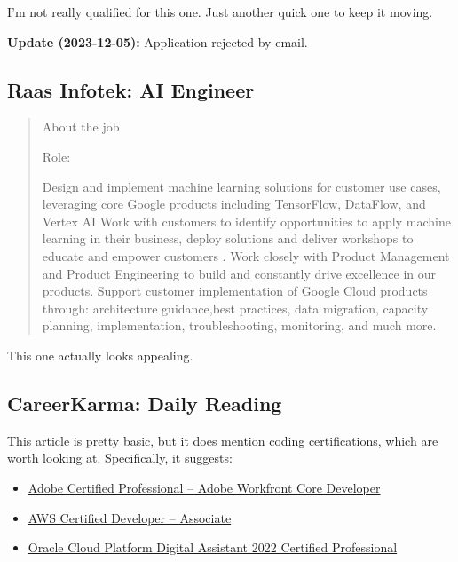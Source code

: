\documentclass[
	letterpaper, %
	12pt, %
]{CSSullivanBusinessReport}
\begin{document}
I'm not really qualified for this one. Just another quick one to keep it moving. 

\textbf{Update (2023-12-05):} Application rejected by email.

\subsection[Raas Infotek]{Raas Infotek: AI Engineer}

\begin{quote}
	About the job
	
	Role:
	
	Design and implement machine learning solutions for customer use cases, leveraging core Google products including TensorFlow, DataFlow, and Vertex AI
	Work with customers to identify opportunities to apply machine learning in their business, deploy solutions and deliver workshops to educate and empower customers .
	Work closely with Product Management and Product Engineering to build and constantly drive excellence in our products.
	Support customer implementation of Google Cloud products through: architecture guidance,best practices, data migration, capacity planning, implementation, troubleshooting, monitoring, and much more. 
\end{quote}

This one actually looks appealing. 

\subsection[CareerKarma]{CareerKarma: Daily Reading \autocite{careerkarmaCodingSteps}}

\href{https://careerkarma.com/blog/how-to-get-a-job-in-coding}{This article} is pretty basic, but it does mention coding certifications, which are worth looking at. Specifically, it suggests: 

\begin{itemize}
	\item \href{https://spark.adobe.com/page/07VQBSuNDWMR4/}{Adobe Certified Professional – Adobe Workfront Core Developer}
	\item \href{https://aws.amazon.com/certification/certified-developer-associate/}{AWS Certified Developer – Associate}
	\item \href{https://education.oracle.com/oracle-cloud-platform-digital-assistant-2022-certified-professional/trackp_OCPDA2022CP}{Oracle Cloud Platform Digital Assistant 2022 Certified Professional}
\end{itemize}
\end{document}
